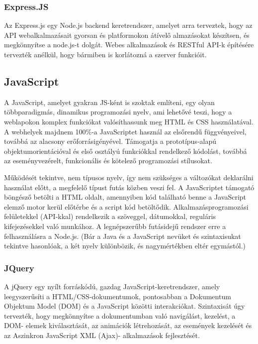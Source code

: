\subsubsection{Express.JS}

Az Express.js egy Node.js backend keretrendszer, amelyet arra terveztek, hogy az API webalkalmazásait gyorsan és platformokon átívelő almazásokat készítsen, és megkönnyítse a node.js-t dolgát. Webes alkalmazások és RESTful API-k építésére tervezték anélkül, hogy bármiben is korlátozná a szerver funkcióit.

\subsection{JavaScript}

A JavaScript, amelyet gyakran JS-ként is szoktak említeni, egy olyan többparadigmás, dinamikus programozási nyelv, ami lehetővé teszi, hogy a weblapokon komplex funkciókat valósíthassunk meg HTML és CSS használatával. A webhelyek majdnem 100\%-a JavaScriptet használ az elsőrendű függvényeivel, továbbá az alacsony erőforrásigényével. Támogatja a prototípus-alapú objektumorientációval és első osztályú funkciókkal rendelkező kódolást, továbbá az eseményvezérelt, funkcionális és kötelező programozási stílusokat. 

Működését tekintve, nem típusos nyelv, így nem szükséges a változókat deklarálni használat előtt, a megfelelő típust futás közben veszi fel. A JavaScriptet támogató böngésző betölti a HTML oldalt, amennyiben kód található benne a JavaScript elemző motor kerül előtérbe és a script kód betöltődik. Alkalmazásprogramozási felületekkel (API-kkal) rendelkezik a szöveggel, dátumokkal, reguláris kifejezésekkel való munkához. A legnépszerűbb futásidejű rendszer erre a felhasználásra a Node.js. (Bár a Java és a JavaScript nevüket és szintaxisukat tekintve hasonlóak, a két nyelv különbözik, és nagymértékben eltér egymástól.)  \cite{wikiJS}

\subsubsection{JQuery}

A jQuery egy nyílt forráskódú, gazdag JavaScript-keretrendszer, amely leegyszerűsíti a HTML/CSS-dokumentumok, pontosabban a Dokumentum Objektum Model (DOM) és a JavaScript közötti interakciókat. Szintaxisát úgy tervezték, hogy megkönnyítse a dokumentumban való navigálást, kezelést, a DOM- elemek kiválasztását, az animációk létrehozását, az események kezelését és az Aszinkron JavaScript XML (Ajax)- alkalmazások fejlesztését.


